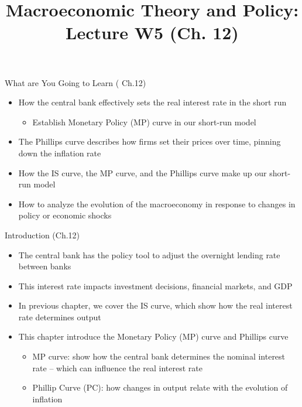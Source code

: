 \documentclass[aspectratio=1610]{beamer}
\title[Winter - Lecture 5] %
{Macroeconomic Theory and Policy: Lecture  W5 (Ch. 12)}
\author[University of Toronto] %
{}
\date[] %
\begin{document}
\begin{frame}
  \titlepage
\end{frame}

\begin{frame}[wide]{What are You Going to Learn ( Ch.12)}
	\begin{itemize}
		\item How the central bank effectively sets the real interest rate in the short run
		\vspace{1mm}
		\begin{itemize}
			\item Establish Monetary Policy (MP) curve in our short-run model
		\end{itemize}
		\vspace{2mm}
		\item The Phillips curve describes how firms set their prices over time, pinning down the inflation rate
		\vspace{2mm}
		\item How the IS curve, the MP curve, and the Phillips curve make up our short-run model
		\vspace{2mm}
		\item How to analyze the evolution of the macroeconomy in response to changes in policy or economic shocks
	\end{itemize}
\end{frame}

\begin{frame}[wide]{Introduction (Ch.12)}
	\begin{itemize}
		\item The central bank has the policy tool to adjust the overnight lending rate between banks
		\vspace{2mm}
		\item This interest rate impacts investment decisions, financial markets, and GDP
		\vspace{2mm}
		\item In previous chapter, we cover the IS curve, which show how the real interest rate determines output
		\vspace{2mm}
		\item This chapter introduce the Monetary Policy (MP) curve and Phillips curve 
		\vspace{1mm}
		\begin{itemize}
			\item MP curve: show how the central bank determines the nominal interest rate -- which can influence the real interest rate
			\vspace{1mm}
			\item Phillip Curve (PC): how changes in output relate with the evolution of inflation
		\end{itemize}
	\end{itemize}
\end{frame}
\end{document}
